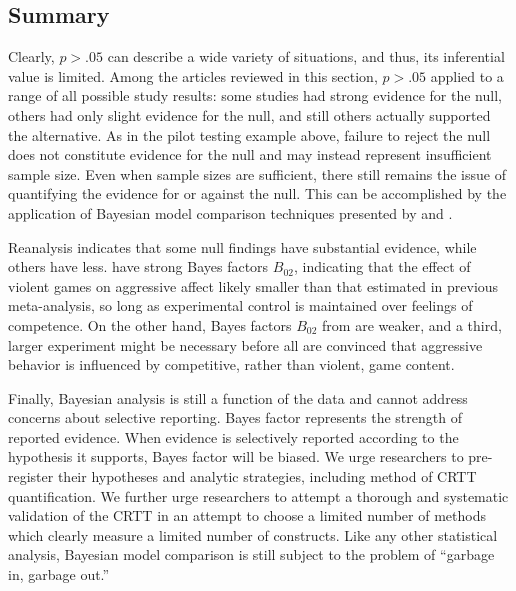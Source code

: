 \documentclass[man]{apa6}
\begin{document}
\subsection{Summary}
Clearly, $p > .05$ can describe a wide variety of situations, and thus, its inferential value is limited. Among the articles reviewed in this section, $p > .05$ applied to a range of all possible study results: some studies had strong evidence for the null, others had only slight evidence for the null, and still others actually supported the alternative. As in the pilot testing example above, failure to reject the null does not constitute evidence for the null and may instead represent insufficient sample size. Even when sample sizes are sufficient, there still remains the issue of quantifying the evidence for or against the null. This can be accomplished by the application of Bayesian model comparison techniques presented by \citet{Rouder:Morey:2012, Rouder:etal:2012}
and \citet{Dienes:2011, Dienes:2014}. %

Reanalysis indicates that some null findings have substantial evidence, while others have less. \citet{Przybylski:etal:2014} have strong Bayes factors $B_{02}$, indicating that the effect of violent games on aggressive affect likely smaller than that estimated in previous meta-analysis, so long as experimental control is maintained over feelings of competence. On the other hand, Bayes factors $B_{02}$ from \citet{Adachi:Willoughby:2011} are weaker, and a third, larger experiment might be necessary before all are convinced that aggressive behavior is influenced by competitive, rather than violent, game content.

Finally, Bayesian analysis is still a function of the data and cannot address concerns about selective reporting. Bayes factor represents the strength of reported evidence. When evidence is selectively reported according to the hypothesis it supports, Bayes factor will be biased. We urge researchers to pre-register their hypotheses and analytic strategies, including method of CRTT quantification. We further urge researchers to attempt a thorough and systematic validation of the CRTT in an attempt to choose a limited number of methods which clearly measure a limited number of constructs. Like any other statistical analysis, Bayesian model comparison is still subject to the problem of ``garbage in, garbage out.''
\end{document}
